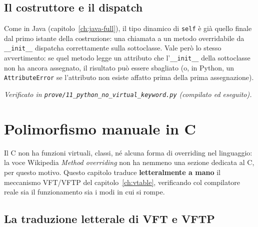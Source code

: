 \documentclass{report}
\newcommand{\code}[1]{\texttt{\small #1}}
\newcommand{\fonteprove}[1]{{\footnotesize\itshape\color{gray} Verificato in \code{prove/#1} (compilato ed eseguito).\par}}
\begin{document}
\section{Il costruttore e il dispatch}

Come in Java (capitolo~\ref{ch:java-full}), il tipo dinamico di
\code{self} è già quello finale dal primo istante della costruzione: una
chiamata a un metodo overridabile da \code{\_\_init\_\_} dispatcha
correttamente sulla sottoclasse. Vale però lo stesso avvertimento: se
quel metodo legge un attributo che l'\code{\_\_init\_\_} della sottoclasse
non ha ancora assegnato, il risultato può essere sbagliato (o, in Python,
un \code{AttributeError} se l'attributo non esiste affatto prima della
prima assegnazione).

\fonteprove{11\_python\_no\_virtual\_keyword.py}

\chapter{Polimorfismo manuale in C}\label{ch:c-full}

Il C non ha funzioni virtuali, classi, né alcuna forma di overriding nel
linguaggio: la voce Wikipedia \emph{Method overriding} non ha nemmeno una
sezione dedicata al C, per questo motivo. Questo capitolo traduce
\textbf{letteralmente a mano} il meccanismo VFT/VFTP del
capitolo~\ref{ch:vtable}, verificando col compilatore reale sia il
funzionamento sia i modi in cui si rompe.

\section{La traduzione letterale di VFT e VFTP}
\end{document}
